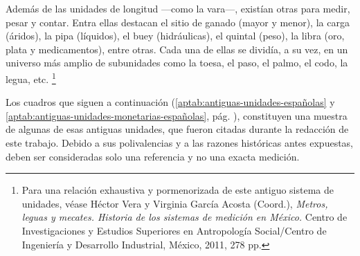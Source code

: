 \documentclass[14pt,twoside,final]{extbook} %
\let\oldfootnote\footnote
\renewcommand\footnote[1]{%
\oldfootnote{\hspace{1mm}#1}}
\begin{document}
Además de las unidades de longitud ---como la vara---, existían otras para medir, pesar y
contar. Entra ellas destacan el sitio de ganado (mayor y menor), la carga (áridos), la pipa (líquidos), el buey (hidráulicas), el quintal (peso), la libra (oro, plata y medicamentos), entre otras. Cada una de ellas se dividía, a su vez, en un universo más amplio de subunidades como la toesa, el paso, el palmo, el codo, la legua, etc.\footnote{Para una relación exhaustiva y pormenorizada de este antiguo sistema de unidades, véase Héctor Vera y Virginia García Acosta (Coord.), \emph{Metros, leguas y mecates. Historia de los sistemas de medición en México.} Centro de Investigaciones y Estudios Superiores en Antropología Social/Centro de Ingeniería y Desarrollo Industrial, México, 2011, 278 pp.}

Los cuadros que siguen a continuación (\ref{aptab:antiguas-unidades-españolas} y \ref{aptab:antiguas-unidades-monetarias-españolas}, pág. \pageref{apsec:antiguas-unidades-españolas-cuadros}), constituyen una muestra de algunas de esas antiguas unidades, que fueron citadas durante la redacción de este trabajo. Debido a sus polivalencias y a las razones históricas antes expuestas, deben ser consideradas solo una referencia y no una exacta medición.
\end{document}
